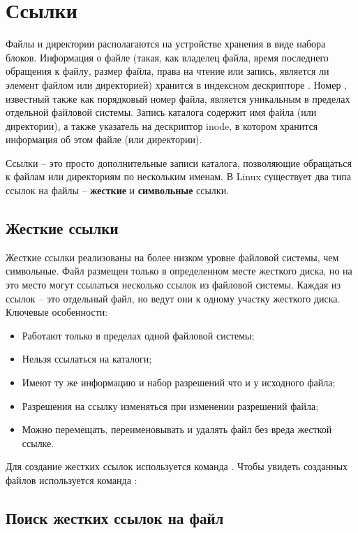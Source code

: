\section{Ссылки}

Файлы и директории располагаются на устройстве хранения в виде набора блоков. Информация о файле (такая, как владелец файла, время последнего обращения к файлу, размер файла, права на чтение или запись, является ли элемент файлом или директорией) хранится в индексном дескрипторе . Номер , известный также как порядковый номер файла, является уникальным в пределах отдельной файловой системы. Запись каталога содержит имя файла (или директории), а также указатель на дескриптор inode, в котором хранится информация об этом файле (или директории).

Ссылки -- это просто дополнительные записи каталога, позволяющие обращаться к файлам или директориям по нескольким именам. В Linux существует два типа ссылок на файлы -- \textbf{жесткие} и \textbf{символьные} ссылки. 

\subsection{Жесткие ссылки}

Жесткие ссылки реализованы на более низком уровне файловой системы, чем символьные. Файл размещен только в определенном месте жесткого диска, но на это место могут ссылаться несколько ссылок из файловой системы. Каждая из ссылок -- это отдельный файл, но ведут они к одному участку жесткого диска. Ключевые особенности:
\begin{itemize}
	\item Работают только в пределах одной файловой системы;
	\item Нельзя ссылаться на каталоги;
	\item Имеют ту же информацию  и набор разрешений что и у исходного файла;
	\item Разрешения на ссылку изменяться при изменении разрешений файла;
	\item Можно перемещать, переименовывать и удалять файл без вреда жесткой ссылке.
\end{itemize}

Для создание жестких ссылок используется команда . Чтобы увидеть  созданных файлов используется команда :


\subsection{Поиск жестких ссылок на файл}

